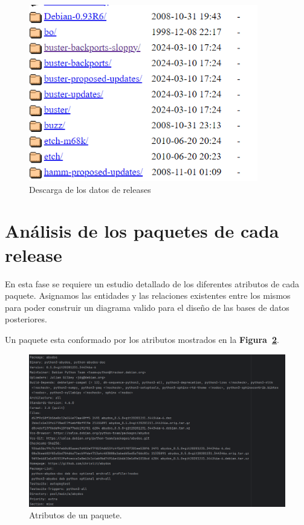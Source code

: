 \documentclass[a4paper, 12pt]{book}
\begin{document}
\begin{figure}
	\centering
	\includegraphics[width=10cm, keepaspectratio]{img/releases.png}
	\caption{Descarga de los datos de releases}
	\label{fig:Descarga_releases}
\end{figure}

\section{Análisis de los paquetes de cada release} 
\label{sec:analisis_de_los_paquetes}

En esta fase se requiere un estudio detallado de los diferentes atributos de cada paquete. Asignamos las entidades y las relaciones existentes entre los mismos para poder construir un diagrama valido para el diseño de las bases de datos posteriores.

Un paquete esta conformado por los atributos mostrados en la \textbf {Figura~\ref{fig:paquete}}.

\begin{figure}
	\centering
	\includegraphics[width=15cm, keepaspectratio]{img/paquete.png}
	\caption{Atributos de un paquete.}
	\label{fig:paquete}
\end{figure}
\end{document}
